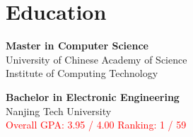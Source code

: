 \documentclass[a4paper,10pt]{article}
\begin{document}
\begin{adjustbox}{valign=t}
\begin{minipage}{0.3\textwidth}
\vfill

\section*{Education}
	\begin{description}
	\raggedright

	\item [\normalfont \textcolor{ColorOne}{Aug. 2021 - Present}] \textbf{Master in Computer Science}\\
	University of Chinese Academy of Science \\
	Institute of Computing Technology

	\item [\normalfont \textcolor{ColorOne}{Aug. 2017 - Jun. 2021}] \textbf{Bachelor in Electronic Engineering} \\ 
	Nanjing Tech University \\
	\textcolor{red}{Overall GPA:  3.95 / 4.00}
	\textcolor{red}{Ranking:  1 / 59}
	
\end{description}

\vfill
\end{minipage}
\end{adjustbox}
%
%
%
\hfill
\begin{adjustbox}{valign=t}
\begin{minipage}{0.05\textwidth} %
\MyVerticalRule  %
\end{minipage}
\end{adjustbox}
\hfill
%
\end{document}
